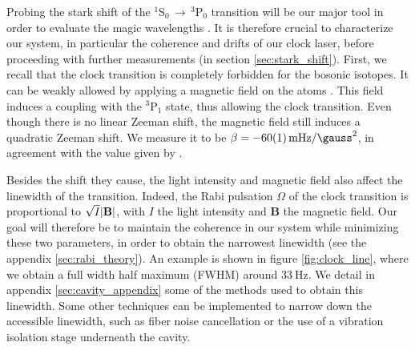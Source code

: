 \documentclass[11pt]{article}
\numberwithin{equation}{section}
\numberwithin{figure}{section}
\begin{document}
Probing the stark shift of the $^1$S$_0 \, \rightarrow \, ^3$P$_0$ transition will be our major tool in order to evaluate the magic wavelengths \citep[with a similar method as][who measured the $\SI{759}{\nano\metre}$ magic wavelength]{2008_barber}. It is therefore crucial to characterize our system, in particular the coherence and drifts of our clock laser, before proceeding with further measurements (in section \ref{sec:stark_shift}). First, we recall that the clock transition is completely forbidden for the bosonic isotopes. It can be weakly allowed by applying a magnetic field on the atoms \citep{2006_taichenachev}. This field induces a coupling with the $^3$P$_1$ state, thus allowing the clock transition. Even though there is no linear Zeeman shift, the magnetic field still induces a quadratic Zeeman shift. We measure it to be $\beta = \SI{-60\pm1}{\milli\hertz\per\gauss\squared}$, in agreement with the value given by \cite{2008_poli}.

Besides the shift they cause, the light intensity and magnetic field also affect the linewidth of the transition. Indeed, the Rabi pulsation $\Omega$ of the clock transition is proportional to $\sqrt{I} \abs{\mathbf{B}}$, with $I$ the light intensity and $\mathbf{B}$ the magnetic field. Our goal will therefore be to maintain the coherence in our system while minimizing these two parameters, in order to obtain the narrowest linewidth (see the appendix \ref{sec:rabi_theory}). An example is shown in figure \ref{fig:clock_line}, where we obtain a full width half maximum (FWHM) around $\SI{33}{\hertz}$. We detail in appendix \ref{sec:cavity_appendix} some of the methods used to obtain this linewidth.  Some other techniques can be implemented to narrow down the accessible linewidth, such as fiber noise cancellation \citep{1994_ma} or the use of a vibration isolation stage underneath the cavity.
\end{document}
